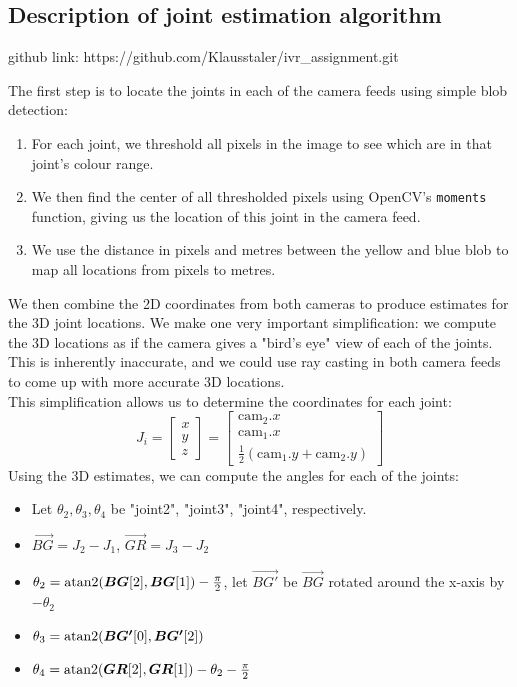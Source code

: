 \subsection{Description of joint estimation algorithm} \label{joint_algo}
github link: https://github.com/Klausstaler/ivr\_assignment.git

The first step is to locate the joints in each of the camera feeds using
simple blob detection:
\begin{enumerate}
    \item
        For each joint, we threshold all pixels in the image to see
        which are in that joint's colour range.
    \item
        We then find the center of all thresholded pixels using
        OpenCV's \texttt{moments} function, giving us the location
        of this joint in the camera feed.
    \item
        We use the distance in pixels and metres between the yellow
        and blue blob to map all locations from pixels to metres.
\end{enumerate}
We then combine the 2D coordinates from both cameras to produce
estimates for the 3D joint locations. We make one very important
simplification: we compute the 3D locations as if the camera
gives a "bird's eye" view of each of the joints.
This is inherently inaccurate, and we could use ray casting in both camera feeds
to come up with more accurate 3D locations.\\
This simplification allows us to determine the coordinates for each joint:
\[ 
    J_i = \begin{bmatrix} x \\ y \\ z \end{bmatrix} =
    \begin{bmatrix} 
        \text{cam}_2.x \\
        \text{cam}_1.x \\
        \frac{1}{2} (\text{cam}_1.y + \text{cam}_2.y)
    \end{bmatrix} 
\]
Using the 3D estimates, we can compute the angles for each of the joints:
\begin{itemize}
    \item
        Let $\theta_2, \theta_3, \theta_4$ be
        "joint2", "joint3", "joint4", respectively.
    \item $\vec{BG} = J_2 - J_1$, $\vec{GR} = J_3 - J_2$
    \item $\theta_2 = \operatorname{atan2}(\bm{BG}[2], \bm{BG}[1]) - \frac{\pi}{2}$,
        let $\vec{BG'}$ be $\vec{BG}$ rotated around the x-axis by $-\theta_2$
    \item $\theta_3 = \operatorname{atan2}(\bm{BG'}[0], \bm{BG'}[2])$
    \item $\theta_4 = \operatorname{atan2}(\bm{GR}[2],\bm{GR}[1]) - \theta_2 - \frac{\pi}{2}$
\end{itemize}

